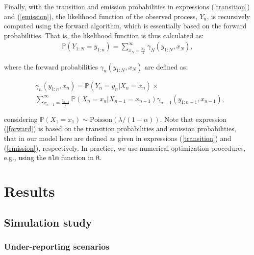 \documentclass[Afour,sageh,times]{sagej}
\begin{document}
Finally, with the transition and emission probabilities in expressions (\ref{transition}) and (\ref{emission}), the likelihood function of the observed process, $Y_n$, is recursively computed using the forward algorithm, which is essentially based on the forward probabilities. That is, the likelihood function is thus calculated as:
\begin{align}
\mathbb{P}\left(Y_{1:N}=y_{1:n}\right)=\sum_{x_N=\frac{y_N}{2}}^{\infty}\gamma_N\left(y_{1:N},x_N\right),
\end{align}

where the forward probabilities $\gamma_n\left(y_{1:N},x_N\right)$ are defined as:

\begin{align}\label{forward}
& \gamma_n(y_{1:n},x_n) = \mathbb{P}(Y_n=y_n|X_n=x_n) \times \nonumber \\ & \sum_{x_{n-1}=\frac{y_{n-1}}{2}}^{\infty}\mathbb{P}(X_n=x_n|X_{n-1}=x_{n-1}) \gamma_{n-1}(y_{1:n-1},x_{n-1}), 
\end{align}

considering $\mathbb{P}(X_1=x_1) \sim \textrm{Poisson}(\lambda/(1-\alpha))$. Note that expression (\ref{forward}) is based on the transition probabilities and emission probabilities, that in our model here are defined as given in expressions (\ref{transition}) and (\ref{emission}), respectively. In practice, we use numerical optimization procedures, e.g., using the \texttt{nlm} function in \texttt{R}. 

\section{Results}
\subsection{Simulation study}
\subsubsection{Under-reporting scenarios}
\end{document}
